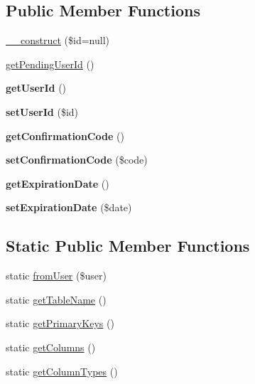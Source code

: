 \subsection*{Public Member Functions}
\begin{DoxyCompactItemize}
\item 
\hyperlink{classPendingUser_a8ca6afa50977bffebf9bd12a8f28fc64}{\_\-\_\-construct} (\$id=null)
\item 
\hyperlink{classPendingUser_a64da5190bd0b37f2b3905eb85c6c09fe}{getPendingUserId} ()
\item 
\hypertarget{classPendingUser_af59f8a6b01cc48da7dc18b90b83482e1}{
{\bfseries getUserId} ()}
\label{classPendingUser_af59f8a6b01cc48da7dc18b90b83482e1}

\item 
\hypertarget{classPendingUser_af6e1e67e7cf278c52e755fa94b4bf042}{
{\bfseries setUserId} (\$id)}
\label{classPendingUser_af6e1e67e7cf278c52e755fa94b4bf042}

\item 
\hypertarget{classPendingUser_afb797503d8876028f1121664ba710ed2}{
{\bfseries getConfirmationCode} ()}
\label{classPendingUser_afb797503d8876028f1121664ba710ed2}

\item 
\hypertarget{classPendingUser_a787a54d903b9143b2519661ecd9a249c}{
{\bfseries setConfirmationCode} (\$code)}
\label{classPendingUser_a787a54d903b9143b2519661ecd9a249c}

\item 
\hypertarget{classPendingUser_ac8023573bdb69c330b0911d565de68f7}{
{\bfseries getExpirationDate} ()}
\label{classPendingUser_ac8023573bdb69c330b0911d565de68f7}

\item 
\hypertarget{classPendingUser_ac5d5743a1086e87053d40c4dd8833ccf}{
{\bfseries setExpirationDate} (\$date)}
\label{classPendingUser_ac5d5743a1086e87053d40c4dd8833ccf}

\end{DoxyCompactItemize}
\subsection*{Static Public Member Functions}
\begin{DoxyCompactItemize}
\item 
static \hyperlink{classPendingUser_af4505a2c00bcb3df5369ac041cfff375}{fromUser} (\$user)
\item 
static \hyperlink{classPendingUser_a8daaf97b6d90a79598d1354c872ac65c}{getTableName} ()
\item 
static \hyperlink{classPendingUser_a305b86bf62019e4ca80b769ea75644cf}{getPrimaryKeys} ()
\item 
static \hyperlink{classPendingUser_a16417ee5731d54b92514e5af71fc715e}{getColumns} ()
\item 
static \hyperlink{classPendingUser_ab157c3fddef5e3fc0e85f40a66033f78}{getColumnTypes} ()
\end{DoxyCompactItemize}
